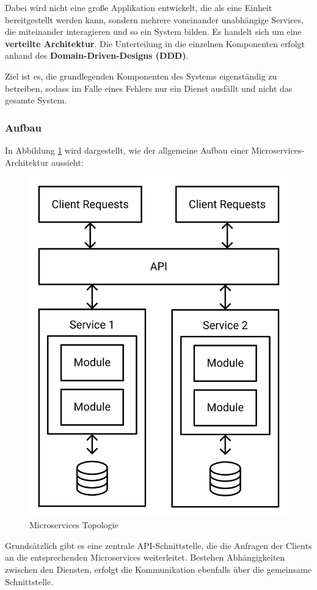     Dabei wird nicht eine große Applikation entwickelt, die als eine Einheit bereitgestellt werden kann, sondern mehrere voneinander unabhängige Services, die miteinander interagieren und so ein System bilden. Es handelt sich um eine \textbf{verteilte Architektur}.
    Die Unterteilung in die einzelnen Komponenten erfolgt anhand des \textbf{Domain-Driven-Designs (DDD)}.
    \cite[S. 251-253]{EA:Book02}

    Ziel ist es, die grundlegenden Komponenten des Systems eigenständig zu betreiben, sodass im Falle eines Fehlers nur ein Dienst ausfällt und nicht das gesamte System. 
    \cite{EA:Web61}

    
        \subsubsection{Aufbau}
    
        In Abbildung \ref{fig:microservices-topology} wird dargestellt, wie der allgemeine Aufbau einer Microservices-Architektur aussieht:
    
        \begin{figure}[H]
            \centering
            \includegraphics[width=0.45\linewidth]{images/EA/microservices-topology.png}
            \caption{Microservices Topologie \\ \cite[S. 252]{EA:Book02}}
            \label{fig:microservices-topology}
        \end{figure}

        Grundsätzlich gibt es eine zentrale API-Schnittstelle, die die Anfragen der Clients an die entsprechenden Microservices weiterleitet.
        Bestehen Abhängigkeiten zwischen den Diensten, erfolgt die Kommunikation ebenfalls über die gemeinsame Schnittstelle.
        \cite{EA:Web61}

